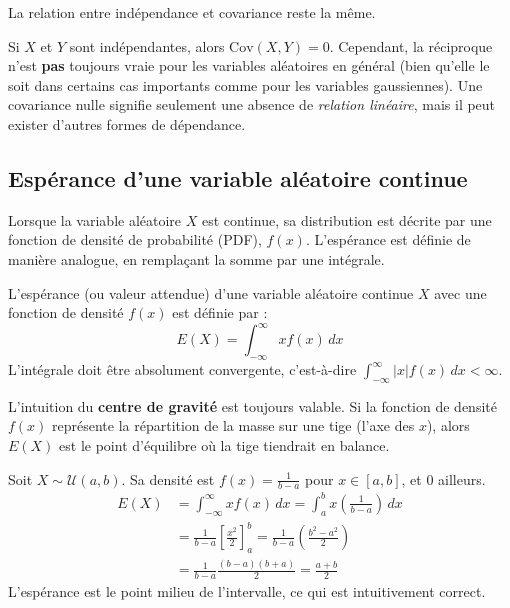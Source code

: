La relation entre indépendance et covariance reste la même.

\begin{remarquebox}
Si $X$ et $Y$ sont indépendantes, alors $\text{Cov}(X, Y) = 0$. Cependant, la réciproque n'est \textbf{pas} toujours vraie pour les variables aléatoires en général (bien qu'elle le soit dans certains cas importants comme pour les variables gaussiennes). Une covariance nulle signifie seulement une absence de \textit{relation linéaire}, mais il peut exister d'autres formes de dépendance.
\end{remarquebox}


\subsection{Espérance d'une variable aléatoire continue}

Lorsque la variable aléatoire $X$ est continue, sa distribution est décrite par une fonction de densité de probabilité (PDF), $f(x)$. L'espérance est définie de manière analogue, en remplaçant la somme par une intégrale.

\begin{definitionbox}
L'espérance (ou valeur attendue) d'une variable aléatoire continue $X$ avec une fonction de densité $f(x)$ est définie par :
$$E(X) = \int_{-\infty}^{\infty} x f(x) \, dx$$
L'intégrale doit être absolument convergente, c'est-à-dire $\int_{-\infty}^{\infty} |x| f(x) \, dx < \infty$.
\end{definitionbox}

\begin{intuitionbox}
L'intuition du \textbf{centre de gravité} est toujours valable. Si la fonction de densité $f(x)$ représente la répartition de la masse sur une tige (l'axe des $x$), alors $E(X)$ est le point d'équilibre où la tige tiendrait en balance.
\end{intuitionbox}

\begin{examplebox}
Soit $X \sim \mathcal{U}(a, b)$. Sa densité est $f(x) = \frac{1}{b-a}$ pour $x \in [a, b]$, et 0 ailleurs.
\begin{align*}
E(X) &= \int_{-\infty}^{\infty} x f(x) \, dx = \int_{a}^{b} x \left( \frac{1}{b-a} \right) \, dx \\
&= \frac{1}{b-a} \left[ \frac{x^2}{2} \right]_a^b = \frac{1}{b-a} \left( \frac{b^2 - a^2}{2} \right) \\
&= \frac{1}{b-a} \frac{(b-a)(b+a)}{2} = \frac{a+b}{2}
\end{align*}
L'espérance est le point milieu de l'intervalle, ce qui est intuitivement correct.
\end{examplebox}

